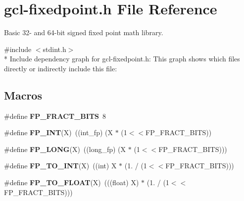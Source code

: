 \hypertarget{gcl-fixedpoint_8h}{}\section{gcl-\/fixedpoint.h File Reference}
\label{gcl-fixedpoint_8h}


Basic 32-\/ and 64-\/bit signed fixed point math library.  


{\ttfamily \#include $<$stdint.\+h$>$}\\*
Include dependency graph for gcl-\/fixedpoint.h\+:
This graph shows which files directly or indirectly include this file\+:
\subsection*{Macros}
\begin{DoxyCompactItemize}
\item 
\#define {\bfseries F\+P\+\_\+\+F\+R\+A\+C\+T\+\_\+\+B\+I\+TS}~8\hypertarget{gcl-fixedpoint_8h_acea1385611e03f002632ed59445727a6}{}\label{gcl-fixedpoint_8h_acea1385611e03f002632ed59445727a6}

\item 
\#define {\bfseries F\+P\+\_\+\+I\+NT}(X)~((int\+\_\+fp) (X $\ast$ (1$<$$<$F\+P\+\_\+\+F\+R\+A\+C\+T\+\_\+\+B\+I\+TS))\hypertarget{gcl-fixedpoint_8h_a130dd28a7462e0fe048250f2fc98dbb2}{}\label{gcl-fixedpoint_8h_a130dd28a7462e0fe048250f2fc98dbb2}

\item 
\#define {\bfseries F\+P\+\_\+\+L\+O\+NG}(X)~((long\+\_\+fp) (X $\ast$ (1$<$$<$F\+P\+\_\+\+F\+R\+A\+C\+T\+\_\+\+B\+I\+TS)))\hypertarget{gcl-fixedpoint_8h_a7c02c1148dd417013a6ba4bd157ddb07}{}\label{gcl-fixedpoint_8h_a7c02c1148dd417013a6ba4bd157ddb07}

\item 
\#define {\bfseries F\+P\+\_\+\+T\+O\+\_\+\+I\+NT}(X)~((int) X $\ast$ (1. / (1$<$$<$F\+P\+\_\+\+F\+R\+A\+C\+T\+\_\+\+B\+I\+TS)))\hypertarget{gcl-fixedpoint_8h_a9bcd91757487d88d69433aa7bcc01c70}{}\label{gcl-fixedpoint_8h_a9bcd91757487d88d69433aa7bcc01c70}

\item 
\#define {\bfseries F\+P\+\_\+\+T\+O\+\_\+\+F\+L\+O\+AT}(X)~(((float) X) $\ast$ (1. / (1$<$$<$F\+P\+\_\+\+F\+R\+A\+C\+T\+\_\+\+B\+I\+TS)))\hypertarget{gcl-fixedpoint_8h_a292fe0f9de86226446693772ae356f91}{}\label{gcl-fixedpoint_8h_a292fe0f9de86226446693772ae356f91}

\end{DoxyCompactItemize}
